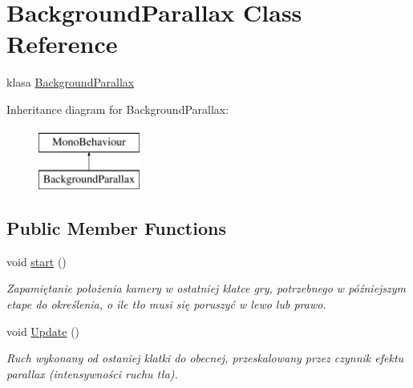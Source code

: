 \hypertarget{class_background_parallax}{}\section{Background\+Parallax Class Reference}
\label{class_background_parallax}


klasa \hyperlink{class_background_parallax}{Background\+Parallax}  


Inheritance diagram for Background\+Parallax\+:\begin{figure}[H]
\begin{center}
\leavevmode
\includegraphics[height=2.000000cm]{class_background_parallax}
\end{center}
\end{figure}
\subsection*{Public Member Functions}
\begin{DoxyCompactItemize}
\item 
void \hyperlink{class_background_parallax_abb5fc2464be1a1bba55238be509a2082}{start} ()
\begin{DoxyCompactList}\small\item\em Zapamiętanie położenia kamery w ostatniej klatce gry, potrzebnego w późniejszym etape do określenia, o ile tło musi się poruszyć w lewo lub prawo. \end{DoxyCompactList}\item 
void \hyperlink{class_background_parallax_a77b333e27f605355ee6b98eb58641ab5}{Update} ()
\begin{DoxyCompactList}\small\item\em Ruch wykonany od ostaniej klatki do obecnej, przeskalowany przez czynnik efektu parallax (intensywności ruchu tła). \end{DoxyCompactList}\end{DoxyCompactItemize}
